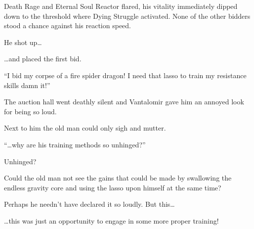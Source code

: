 \documentclass[a4paper,10pt]{book}
\begin{document}
Death Rage and Eternal Soul Reactor flared, his vitality immediately dipped down to the threshold where Dying Struggle activated. None of the other bidders stood a chance against his reaction speed.\par
He shot up…\par
…and placed the first bid.\par
“I bid my corpse of a fire spider dragon! I need that lasso to train my resistance skills damn it!”\par
The auction hall went deathly silent and Vantalomir gave him an annoyed look for being so loud.\par
Next to him the old man could only sigh and mutter.\par
“…why are his training methods so unhinged?”\par
Unhinged?\par
Could the old man not see the gains that could be made by swallowing the endless gravity core and using the lasso upon himself at the same time?\par
Perhaps he needn’t have declared it so loudly. But this…\par
…this was just an opportunity to engage in some more proper training!\par
\end{document}
